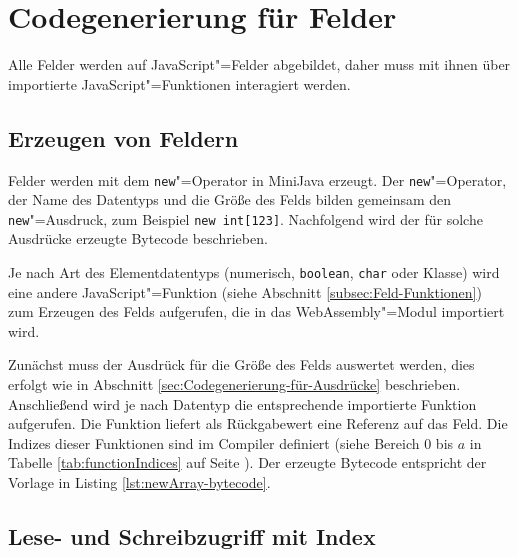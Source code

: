 

\section{Codegenerierung für Felder}
Alle Felder werden auf JavaScript"=Felder abgebildet, daher muss mit ihnen über importierte JavaScript"=Funktionen interagiert werden.

\subsection{Erzeugen von Feldern}
\label{subsec:Erzeugen-von-Feldern}

Felder werden mit dem \lstinline{new}"=Operator in MiniJava erzeugt. Der \lstinline{new}"=Operator, der Name des Datentyps und die Größe des Felds bilden gemeinsam den \lstinline{new}"=Ausdruck, zum Beispiel \lstinline{new int[123]}. Nachfolgend wird der für solche Ausdrücke erzeugte Bytecode beschrieben.

Je nach Art des Elementdatentyps (numerisch, \lstinline{boolean}, \lstinline{char} oder Klasse) wird eine andere JavaScript"=Funktion (siehe Abschnitt \ref{subsec:Feld-Funktionen}) zum Erzeugen des Felds aufgerufen, die in das WebAssembly"=Modul importiert wird.

Zunächst muss der Ausdrück für die Größe des Felds auswertet werden, dies erfolgt wie in Abschnitt \ref{sec:Codegenerierung-für-Ausdrücke} beschrieben. Anschließend wird je nach Datentyp die entsprechende importierte Funktion aufgerufen. Die Funktion liefert als Rückgabewert eine Referenz auf das Feld. Die Indizes dieser Funktionen sind im Compiler definiert (siehe Bereich $0$ bis $a$ in Tabelle \ref{tab:functionIndices} auf Seite \pageref{tab:functionIndices}). Der erzeugte Bytecode entspricht der Vorlage in Listing \ref{lst:newArray-bytecode}.



\subsection{Lese- und Schreibzugriff mit Index}
\label{subsec:Lese-und-Schreibzugriff-mit-Index}

